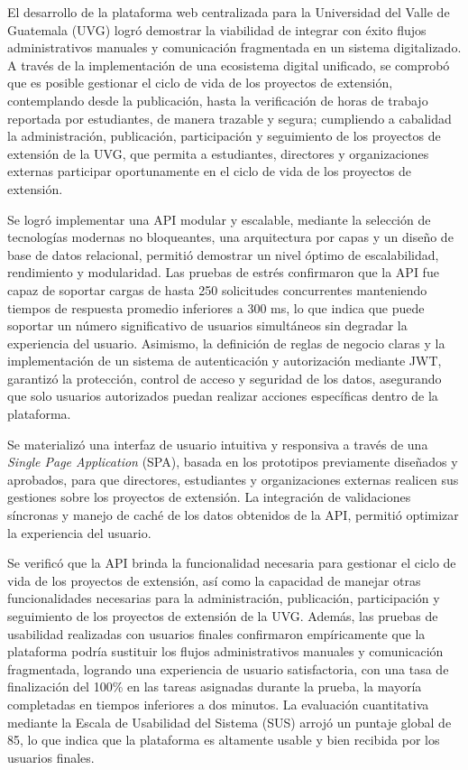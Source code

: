 El desarrollo de la plataforma web centralizada para la Universidad del Valle de Guatemala (UVG) logró demostrar
la viabilidad de integrar con éxito flujos administrativos manuales y comunicación fragmentada en un sistema
digitalizado. A través de la implementación de una ecosistema digital unificado, se comprobó que es posible
gestionar el ciclo de vida de los proyectos de extensión, contemplando desde la publicación, hasta la verificación
de horas de trabajo reportada por estudiantes, de manera trazable y segura; cumpliendo a cabalidad la administración,
publicación, participación y seguimiento de los proyectos de extensión de la UVG, que permita a estudiantes,
directores y organizaciones externas participar oportunamente en el ciclo de vida de los proyectos de extensión.

Se logró implementar una API modular y escalable, mediante la selección de tecnologías modernas no bloqueantes,
una arquitectura por capas y un diseño de base de datos relacional, permitió demostrar un nivel óptimo de 
escalabilidad, rendimiento y modularidad. Las pruebas de estrés confirmaron que la API fue capaz de soportar
cargas de hasta 250 solicitudes concurrentes manteniendo tiempos de respuesta promedio inferiores a 300 ms,
lo que indica que puede soportar un número significativo de usuarios simultáneos sin degradar la experiencia
del usuario. Asimismo, la definición de reglas de negocio claras y la implementación de un sistema de
autenticación y autorización mediante JWT, garantizó la protección, control de acceso y seguridad de los
datos, asegurando que solo usuarios autorizados puedan realizar acciones específicas dentro de la plataforma.

Se materializó una interfaz de usuario intuitiva y responsiva a través de una \textit{Single Page Application}
(SPA), basada en los prototipos previamente diseñados y aprobados, para que directores, estudiantes y
organizaciones externas realicen sus gestiones sobre los proyectos de extensión. 
La integración de validaciones síncronas y manejo de caché de los datos obtenidos de la API, permitió optimizar
la experiencia del usuario.

Se verificó que la API brinda la funcionalidad necesaria para gestionar el ciclo de vida de los proyectos de
extensión, así como la capacidad de manejar otras funcionalidades necesarias para la administración, publicación,
participación y seguimiento de los proyectos de extensión de la UVG.
Además, las pruebas de usabilidad realizadas con usuarios finales confirmaron empíricamente que la plataforma podría
sustituir los flujos administrativos manuales y comunicación fragmentada, logrando una experiencia de usuario
satisfactoria, con una tasa de finalización del 100\% en las tareas asignadas durante la prueba, la mayoría
completadas en tiempos inferiores a dos minutos. La evaluación cuantitativa mediante la Escala de Usabilidad
del Sistema (SUS) arrojó un puntaje global de 85, lo que indica que la plataforma es altamente usable y bien
recibida por los usuarios finales.

